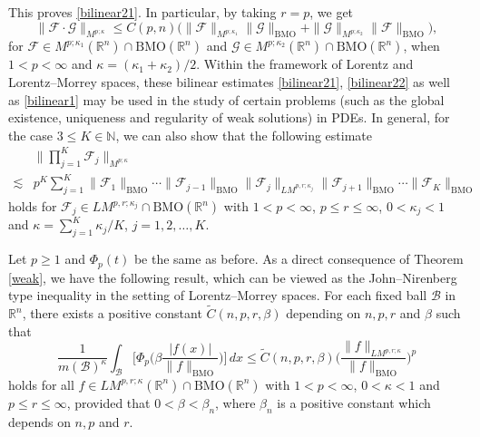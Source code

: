 \documentclass{birkjour}
\theoremstyle{definition}
\theoremstyle{remark}
\numberwithin{equation}{section}
\begin{document}
This proves \eqref{bilinear21}. In particular, by taking $r=p$, we get
\begin{equation}\label{bilinear22}
\|\mathcal{F}\cdot \mathcal{G}\|_{M^{p;\kappa}}\leq C(p,n)
\Big(\|\mathcal{F}\|_{M^{p;\kappa_1}}\|\mathcal{G}\|_{\mathrm{BMO}}
+\|\mathcal{G}\|_{M^{p;\kappa_2}}\|\mathcal{F}\|_{\mathrm{BMO}}\Big),
\end{equation}
for $\mathcal{F}\in M^{p;\kappa_1}(\mathbb R^n)\cap\mathrm{BMO}(\mathbb R^n)$ and $\mathcal{G}\in M^{p;\kappa_2}(\mathbb R^n)\cap\mathrm{BMO}(\mathbb R^n)$, when $1<p<\infty$ and $\kappa={(\kappa_1+\kappa_2)}/2$. Within the framework of Lorentz and Lorentz--Morrey spaces, these bilinear estimates \eqref{bilinear21}, \eqref{bilinear22} as well as \eqref{bilinear1} may be used in the study of certain problems (such as the global existence, uniqueness and regularity of weak solutions) in PDEs. In general, for the case $3\leq K\in \mathbb{N}$, we can also show that the following estimate
\begin{equation*}
\begin{split}
&\bigg\|\prod_{j=1}^K \mathcal{F}_j\bigg\|_{M^{p;\kappa}}\\
\lesssim& p^{K}
\sum_{j=1}^{K}\|\mathcal{F}_1\|_{\mathrm{BMO}}\cdots\|\mathcal{F}_{j-1}\|_{\mathrm{BMO}}
\|\mathcal{F}_j\|_{LM^{p,r;\kappa_j}}\|\mathcal{F}_{j+1}\|_{\mathrm{BMO}}\cdots\|\mathcal{F}_K\|_{\mathrm{BMO}}
\end{split}
\end{equation*}
holds for $\mathcal{F}_j\in LM^{p,r;\kappa_j}\cap\mathrm{BMO}(\mathbb R^n)$ with $1<p<\infty$, $p\leq r\leq\infty$, $0<\kappa_j<1$ and $\kappa=\sum_{j=1}^{K}\kappa_j/K$, $j=1,2,\dots,K$.

Let $p\geq1$ and $\Phi_p(t)$ be the same as before. As a direct consequence of Theorem \ref{weak}, we have the following result, which can be viewed as the John--Nirenberg type inequality in the setting of Lorentz--Morrey spaces.
For each fixed ball $\mathcal{B}$ in $\mathbb R^n$, there exists a positive constant $\widetilde{C}({n,p,r,\beta})$ depending on $n,p,r$ and $\beta$ such that
\begin{equation}\label{bilinear24}
\frac{1}{m(\mathcal{B})^{\kappa}}\int_{\mathcal{B}}\bigg[\Phi_p\Big(\beta\frac{|f(x)|}{\|f\|_{\mathrm{BMO}}}\Big)\bigg]\,dx
\leq \widetilde{C}({n,p,r,\beta})\bigg(\frac{\|f\|_{LM^{p,r;\kappa}}}{\|f\|_{\mathrm{BMO}}}\bigg)^p
\end{equation}
holds for all $f\in LM^{p,r;\kappa}(\mathbb R^n)\cap\mathrm{BMO}(\mathbb R^n)$ with $1<p<\infty$, $0<\kappa<1$ and $p\leq r\leq\infty$, provided that $0<\beta<\beta_n$, where $\beta_n$ is a positive constant which depends on $n,p$ and $r$.
\end{document}
